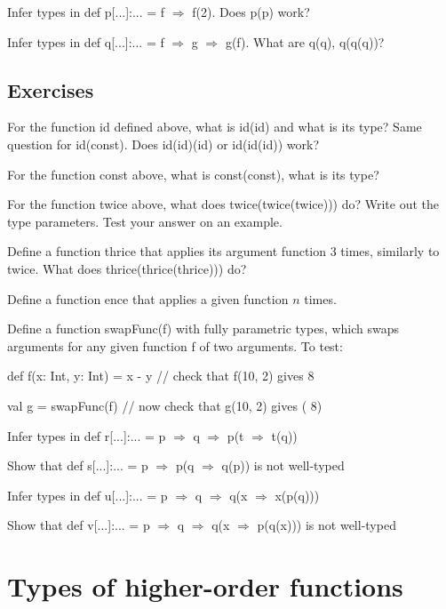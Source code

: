 Infer types in def p{[}...{]}:... = f $\Rightarrow$ f(2). Does p(p)
work?

Infer types in def q{[}...{]}:... = f $\Rightarrow$ g $\Rightarrow$
g(f). What are q(q), q(q(q))?

\subsection{Exercises}

For the function id defined above, what is id(id) and what is its
type? Same question for id(const). Does id(id)(id) or id(id(id)) work? 

For the function const above, what is const(const), what is its type?

For the function twice above, what does twice(twice(twice))) do? Write
out the type parameters. Test your answer on an example.

Define a function thrice that applies its argument function 3 times,
similarly to twice. What does thrice(thrice(thrice))) do?

Define a function ence that applies a given function $n$ times.

Define a function swapFunc(f) with fully parametric types, which swaps
arguments for any given function f of two arguments. To test: 

def f(x: Int, y: Int) = x - y // check that f(10, 2) gives 8

val g = swapFunc(f)  // now check that g(10, 2) gives (\textendash{}
8)

Infer types in def r{[}...{]}:... = p $\Rightarrow$ q $\Rightarrow$
p(t $\Rightarrow$ t(q))

Show that def s{[}...{]}:... = p $\Rightarrow$ p(q $\Rightarrow$
q(p)) is not well-typed

Infer types in def u{[}...{]}:... = p $\Rightarrow$ q $\Rightarrow$
q(x $\Rightarrow$ x(p(q)))

Show that def v{[}...{]}:... = p $\Rightarrow$ q $\Rightarrow$ q(x
$\Rightarrow$ p(q(x))) is not well-typed

\section{Types of higher-order functions}

